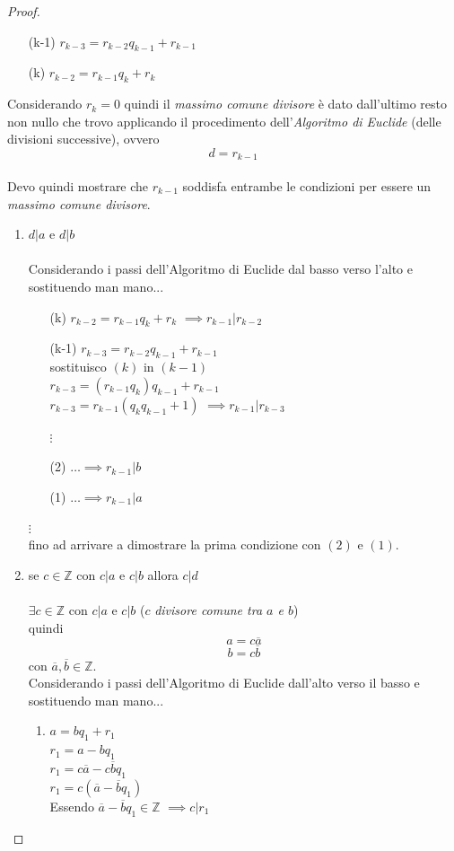 \documentclass[a4paper,12pt, oneside]{book}
\begin{document}
\begin{proof}
\begin{itemize}
\begin{enumerate}[label=(\arabic*)]
				\item [(k-1)] $r_{k-3} = r_{k-2}q_{k-1} + r_{k-1}$
				\item [(k)] $r_{k-2} = r_{k-1}q_k + r_k$
			\end{enumerate}
			Considerando $r_k = 0$ quindi il \textit{massimo comune divisore} è dato dall'ultimo resto non nullo che trovo applicando il procedimento dell'\textit{Algoritmo di Euclide} (delle divisioni successive), ovvero $$d=r_{k-1}$$\\
			Devo quindi mostrare che $r_{k-1}$ soddisfa entrambe le condizioni per essere un \textit{massimo comune divisore}.
			\begin{enumerate}
				\item $d|a$ e $d|b$\\\\
					Considerando i passi dell'Algoritmo di Euclide dal basso verso l'alto e sostituendo man mano...
					\begin{enumerate}
						\item [(k)] $r_{k-2} = r_{k-1}q_k + r_k$
							$\implies r_{k-1} | r_{k-2}$
						\item [(k-1)] $r_{k-3} = r_{k-2}q_{k-1} + r_{k-1}$\\
							sostituisco $(k)$ in $(k-1)$\\
							$r_{k-3} = (r_{k-1}q_k)q_{k-1} + r_{k-1}$\\
							$r_{k-3} = r_{k-1}(q_kq_{k-1}+1)$
							$\implies r_{k-1} | r_{k-3}$
						
						$\vdots$
						
						\item [(2)] $\dots \implies r_{k-1} | b$
						\item [(1)] $\dots \implies r_{k-1} | a$
					\end{enumerate}
					$\vdots$\\
					fino ad arrivare a dimostrare la prima condizione con $(2)$ e $(1)$.\\				
				
				\item se $c \in \mathbb{Z}$ con $c|a$ e $c|b$ allora $c|d$\\\\
					$\exists c \in \mathbb{Z}$ con $c|a$ e $c|b$ ($c$ \textit{divisore comune tra $a$ e $b$})\\
					quindi $$a = c \overline{a}$$ $$b = c \overline{b}$$
					con $\overline{a}, \overline{b} \in \mathbb{Z}$.\\
					Considerando i passi dell'Algoritmo di Euclide dall'alto verso il basso e sostituendo man mano...
					\begin{enumerate}[label=(\arabic*)]
						\item $a = bq_1 + r_1$\\
							$r_{1} = a-bq_1$\\
							$r_{1} = c\overline{a}-c\overline{b}q_1$\\
							$r_{1} = c(\overline{a}-\overline{b}q_1)$\\
							Essendo $\overline{a}-\overline{b}q_1 \in \mathbb{Z}$ $\implies c|r_1$\\
							

\end{enumerate}
\end{enumerate}
\end{itemize}
\end{proof}
\end{document}
